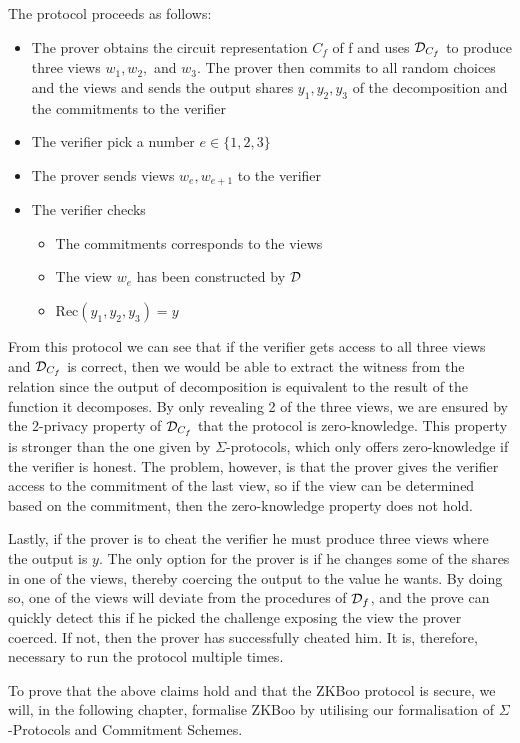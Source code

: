 The protocol proceeds as follows:
\begin{itemize}
  \item The prover obtains the circuit representation $C_{f}$ of f and uses
    $\mathcal{D}_{C_{f}}$ to produce three views $w_{1}, w_{2},$ and $w_{3}$.
    The prover then commits to all random choices and the views and sends the
    output shares $y_{1}, y_{2}, y_{3}$ of the decomposition and the commitments to the verifier
  \item The verifier pick a number $e \in \{1,2,3\}$
  \item The prover sends views $w_{e}, w_{e+1}$ to the verifier
  \item The verifier checks
    \begin{itemize}
      \item The commitments corresponds to the views
      \item The view $w_{e}$ has been constructed by $\mathcal{D}$
      \item Rec$(y_{1}, y_{2}, y_{3}) = y$
    \end{itemize}
\end{itemize}

From this protocol we can see that if the verifier gets access to all three views and
$\mathcal{D}_{C_{f}}$ is correct, then we would be able to extract the witness from
the relation since the output of decomposition is equivalent to the result of
the function it decomposes.
By only revealing 2 of the three views, we are ensured by the 2-privacy property
of $\mathcal{D}_{C_{f}}$ that the protocol is zero-knowledge. This
property is stronger than the one given by $\Sigma$-protocols, which only offers
zero-knowledge if the verifier is honest. The problem, however, is that the
prover gives the verifier access to the commitment of the last view, so if the
view can be determined based on the commitment, then the zero-knowledge property
does not hold.

Lastly, if the prover is to cheat the verifier he must produce three views where
the output is $y$.
The only option for the prover is if he changes some of
the shares in one of the views, thereby coercing the output to the value he wants.
By doing so, one of the views will deviate from the procedures of $\mathcal{D}_{f}$,
and the prove can quickly detect this if he picked the challenge exposing the
view the prover coerced.
If not, then the prover has successfully cheated him.
It is, therefore, necessary to run the protocol
multiple times.

To prove that the above claims hold and that the ZKBoo protocol is secure, we will,
in the following chapter, formalise ZKBoo by utilising our formalisation of
$\Sigma$-Protocols and Commitment Schemes.

